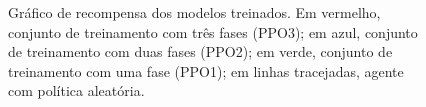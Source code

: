 \begin{figure}[ht]
  \centering
  \captionsetup{width=1\textwidth}
  \caption[Gráfico de recompensa dos modelos treinados.]
  {Gráfico de recompensa dos modelos treinados. Em vermelho, conjunto de treinamento com três fases (PPO3); em azul, conjunto de treinamento com duas fases (PPO2); em verde, conjunto de treinamento com uma fase (PPO1); em linhas tracejadas, agente com política aleatória. }
  \label{fig:avaliacao}
\end{figure}